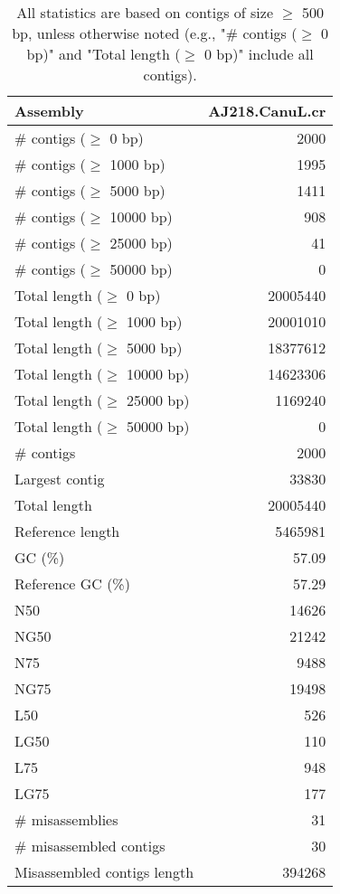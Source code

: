 \documentclass[12pt,a4paper]{article}
\begin{document}
\begin{table}[ht]
\begin{center}
\caption{All statistics are based on contigs of size $\geq$ 500 bp, unless otherwise noted (e.g., "\# contigs ($\geq$ 0 bp)" and "Total length ($\geq$ 0 bp)" include all contigs).}
\begin{tabular}{|l*{1}{|r}|}
\hline
Assembly & AJ218.CanuL.cr \\ \hline
\# contigs ($\geq$ 0 bp) & 2000 \\ \hline
\# contigs ($\geq$ 1000 bp) & 1995 \\ \hline
\# contigs ($\geq$ 5000 bp) & 1411 \\ \hline
\# contigs ($\geq$ 10000 bp) & 908 \\ \hline
\# contigs ($\geq$ 25000 bp) & 41 \\ \hline
\# contigs ($\geq$ 50000 bp) & 0 \\ \hline
Total length ($\geq$ 0 bp) & 20005440 \\ \hline
Total length ($\geq$ 1000 bp) & 20001010 \\ \hline
Total length ($\geq$ 5000 bp) & 18377612 \\ \hline
Total length ($\geq$ 10000 bp) & 14623306 \\ \hline
Total length ($\geq$ 25000 bp) & 1169240 \\ \hline
Total length ($\geq$ 50000 bp) & 0 \\ \hline
\# contigs & 2000 \\ \hline
Largest contig & 33830 \\ \hline
Total length & 20005440 \\ \hline
Reference length & 5465981 \\ \hline
GC (\%) & 57.09 \\ \hline
Reference GC (\%) & 57.29 \\ \hline
N50 & 14626 \\ \hline
NG50 & 21242 \\ \hline
N75 & 9488 \\ \hline
NG75 & 19498 \\ \hline
L50 & 526 \\ \hline
LG50 & 110 \\ \hline
L75 & 948 \\ \hline
LG75 & 177 \\ \hline
\# misassemblies & 31 \\ \hline
\# misassembled contigs & 30 \\ \hline
Misassembled contigs length & 394268 \\ \hline

\end{tabular}
\end{center}
\end{table}
\end{document}
